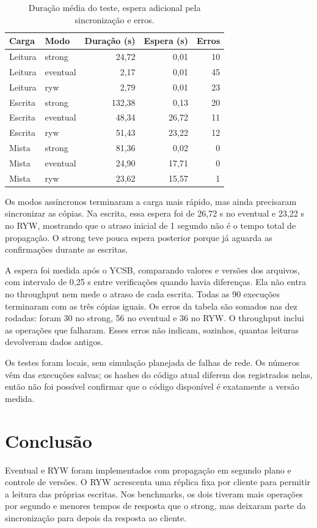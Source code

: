 \begin{table}[!ht]
\centering\small
\caption{Duração média do teste, espera adicional pela sincronização e erros.}
\begin{tabular}{llrrr}
\toprule
Carga & Modo & Duração (s) & Espera (s) & Erros\\\midrule
Leitura & strong & 24,72 & 0,01 & 10\\
Leitura & eventual & 2,17 & 0,01 & 45\\
Leitura & ryw & 2,79 & 0,01 & 23\\
Escrita & strong & 132,38 & 0,13 & 20\\
Escrita & eventual & 48,34 & 26,72 & 11\\
Escrita & ryw & 51,43 & 23,22 & 12\\
Mista & strong & 81,36 & 0,02 & 0\\
Mista & eventual & 24,90 & 17,71 & 0\\
Mista & ryw & 23,62 & 15,57 & 1\\
\bottomrule\end{tabular}
\end{table}

Os modos assíncronos terminaram a carga mais rápido, mas ainda precisaram
sincronizar as cópias. Na escrita, essa espera foi de 26,72 s no eventual e
23,22 s no RYW, mostrando que o atraso inicial de 1 segundo não é o tempo
total de propagação. O strong teve pouca espera posterior porque já aguarda
as confirmações durante as escritas.

A espera foi medida após o YCSB, comparando valores e versões dos arquivos,
com intervalo de 0,25 s entre verificações quando havia diferenças.
Ela não entra no throughput nem mede o atraso de cada escrita. Todas as
90 execuções terminaram com as três cópias iguais. Os erros da tabela são
somados nas dez rodadas: foram 30 no strong, 56 no eventual e 36 no RYW.
O throughput inclui as operações que falharam. Esses erros não indicam,
sozinhos, quantas leituras devolveram dados antigos.

Os testes foram locais, sem simulação planejada de falhas de rede.
Os números vêm das execuções salvas; os hashes do código atual diferem dos
registrados nelas, então não foi possível confirmar que o código disponível
é exatamente a versão medida.

\section{Conclusão}
Eventual e RYW foram implementados com propagação em segundo plano e controle
de versões. O RYW acrescenta uma réplica fixa por cliente para permitir a
leitura das próprias escritas. Nos benchmarks, os dois tiveram mais operações
por segundo e menores tempos de resposta que o strong, mas deixaram parte
da sincronização para depois da resposta ao cliente.
